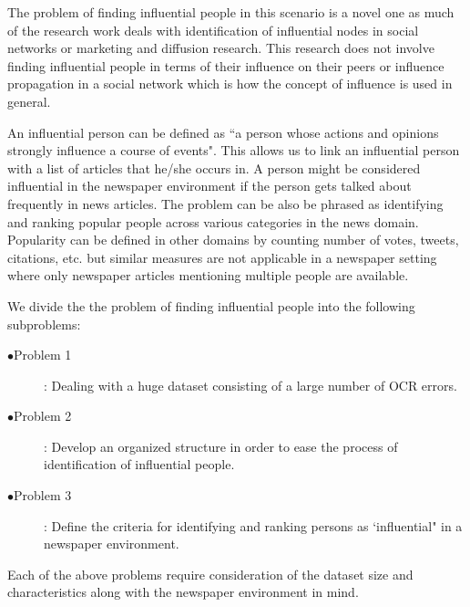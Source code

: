 The problem of finding influential people in this scenario is a novel one as much of the research work deals with identification of influential nodes in social networks or marketing and diffusion research. This research does not involve finding influential people in terms of their influence on their peers\cite{watts2007influentials} or influence propagation in a social network \cite{kempe2003maximizing} which is how the concept of influence is used in general.   

 An influential person can be defined as ``a person whose actions and opinions strongly influence a course of events". This allows us to link an influential person with a list of articles that he/she occurs in.
 A person might be considered influential  in the newspaper environment if the person gets talked about frequently in news articles. The problem can be also be phrased as identifying and ranking popular people across various categories in the news domain. 
Popularity can be defined in other domains by counting number of votes, tweets, citations, etc. \cite{}but similar measures are not applicable in a newspaper setting where only newspaper articles mentioning multiple people are available.  
 
We divide the the problem of finding influential people into the following subproblems:
\begin{description}
\item [$\bullet $Problem 1] \label{problem:1}: Dealing with a huge dataset consisting of a large number of OCR errors.
\item [$\bullet $Problem 2] \label{2}: Develop an organized structure in order to ease the process of identification of influential people.
\item [$\bullet $Problem 3] \label{3}: Define the criteria for identifying and ranking persons as `influential" in a newspaper environment.
\end{description}
  
Each of the above problems require consideration of the dataset size and characteristics along with the newspaper environment in mind. 





